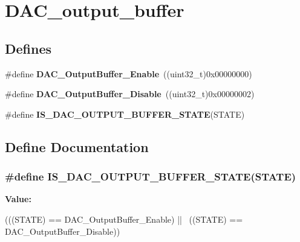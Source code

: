 \hypertarget{group__DAC__output__buffer}{
\section{DAC\_\-output\_\-buffer}
\label{group__DAC__output__buffer}
}
\subsection*{Defines}
\begin{DoxyCompactItemize}
\item 
\hypertarget{group__DAC__output__buffer_gab3f92803a8b6bc5fb3e4859908b5161f}{
\#define {\bfseries DAC\_\-OutputBuffer\_\-Enable}~((uint32\_\-t)0x00000000)}
\label{group__DAC__output__buffer_gab3f92803a8b6bc5fb3e4859908b5161f}

\item 
\hypertarget{group__DAC__output__buffer_gad41f919d7141398cfdedf8218ce64450}{
\#define {\bfseries DAC\_\-OutputBuffer\_\-Disable}~((uint32\_\-t)0x00000002)}
\label{group__DAC__output__buffer_gad41f919d7141398cfdedf8218ce64450}

\item 
\#define {\bfseries IS\_\-DAC\_\-OUTPUT\_\-BUFFER\_\-STATE}(STATE)
\end{DoxyCompactItemize}


\subsection{Define Documentation}
\hypertarget{group__DAC__output__buffer_gaa5a56816d641129fb62d11133c9dcccd}{
\subsubsection[{IS\_\-DAC\_\-OUTPUT\_\-BUFFER\_\-STATE}]{\setlength{\rightskip}{0pt plus 5cm}\#define IS\_\-DAC\_\-OUTPUT\_\-BUFFER\_\-STATE(STATE)}}
\label{group__DAC__output__buffer_gaa5a56816d641129fb62d11133c9dcccd}
{\bfseries Value:}
\begin{DoxyCode}
(((STATE) == DAC_OutputBuffer_Enable) || \
                                           ((STATE) == DAC_OutputBuffer_Disable))
      
\end{DoxyCode}
